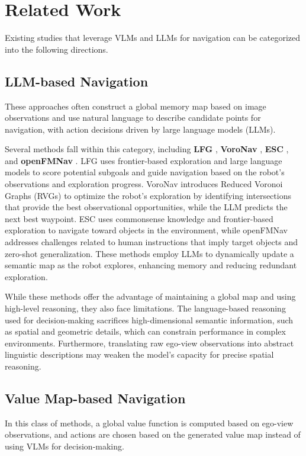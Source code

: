\section{Related Work}
\label{related}
Existing studies that leverage VLMs and LLMs for navigation can be categorized into the following directions.

\subsection{LLM-based Navigation}
These approaches often construct a global memory map based on image observations and use natural language to describe candidate points for navigation, with action decisions driven by large language models (LLMs).

Several methods fall within this category, including \textbf{LFG} \citep{shah2023navigation}, \textbf{VoroNav} \citep{wu2024voronav}, \textbf{ESC} \citep{zhou2023esc}, and \textbf{openFMNav} \citep{kuang2024openfmnav}. LFG uses frontier-based exploration and large language models to score potential subgoals and guide navigation based on the robot’s observations and exploration progress. VoroNav introduces Reduced Voronoi Graphs (RVGs) to optimize the robot’s exploration by identifying intersections that provide the best observational opportunities, while the LLM predicts the next best waypoint. ESC uses commonsense knowledge and frontier-based exploration to navigate toward objects in the environment, while openFMNav addresses challenges related to human instructions that imply target objects and zero-shot generalization. These methods employ LLMs to dynamically update a semantic map as the robot explores, enhancing memory and reducing redundant exploration.

While these methods offer the advantage of maintaining a global map and using high-level reasoning, they also face limitations. The language-based reasoning used for decision-making sacrifices high-dimensional semantic information, such as spatial and geometric details, which can constrain performance in complex environments. Furthermore, translating raw ego-view observations into abstract linguistic descriptions may weaken the model’s capacity for precise spatial reasoning.

\subsection{Value Map-based Navigation}
In this class of methods, a global value function is computed based on ego-view observations, and actions are chosen based on the generated value map instead of using VLMs for decision-making.

